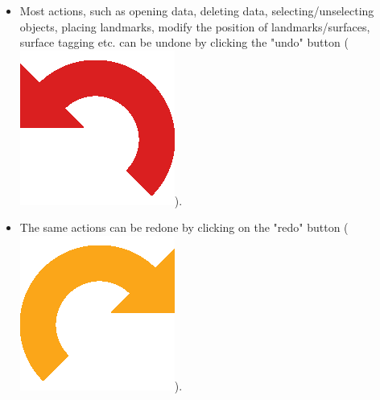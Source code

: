 \begin{itemize}
\item Most actions, such as opening data, deleting data, selecting/unselecting objects, placing landmarks, modify the position of landmarks/surfaces, surface tagging etc. can be undone by clicking the "undo" button (\includegraphics[scale=0.05]{images/03/undo.png}).
\item The same actions can be redone by clicking on the "redo" button (\includegraphics[scale=0.05]{images/03/redo.png}).
\end{itemize}

